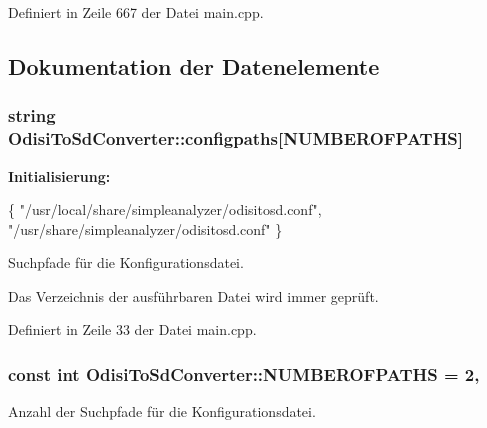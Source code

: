 Definiert in Zeile 667 der Datei main.\-cpp.



\subsection{Dokumentation der Datenelemente}
\hypertarget{classOdisiToSdConverter_aeecf67d22a4b6333ceabe5f1a1036736}{
\subsubsection[{configpaths}]{\setlength{\rightskip}{0pt plus 5cm}string Odisi\-To\-Sd\-Converter\-::configpaths\mbox{[}{\bf N\-U\-M\-B\-E\-R\-O\-F\-P\-A\-T\-H\-S}\mbox{]}\hspace{0.3cm}{\ttfamily [protected]}}}\label{classOdisiToSdConverter_aeecf67d22a4b6333ceabe5f1a1036736}
{\bfseries Initialisierung\-:}
\begin{DoxyCode}
\{
            \textcolor{stringliteral}{"/usr/local/share/simpleanalyzer/odisitosd.conf"},
            \textcolor{stringliteral}{"/usr/share/simpleanalyzer/odisitosd.conf"} \}
\end{DoxyCode}


Suchpfade für die Konfigurationsdatei. 

Das Verzeichnis der ausführbaren Datei wird immer geprüft. 

Definiert in Zeile 33 der Datei main.\-cpp.

\hypertarget{classOdisiToSdConverter_a6f59f3670356c1588b736af33d59532a}{
\subsubsection[{N\-U\-M\-B\-E\-R\-O\-F\-P\-A\-T\-H\-S}]{\setlength{\rightskip}{0pt plus 5cm}const int Odisi\-To\-Sd\-Converter\-::\-N\-U\-M\-B\-E\-R\-O\-F\-P\-A\-T\-H\-S = 2\hspace{0.3cm}{\ttfamily [static]}, {\ttfamily [protected]}}}\label{classOdisiToSdConverter_a6f59f3670356c1588b736af33d59532a}


Anzahl der Suchpfade für die Konfigurationsdatei. 



